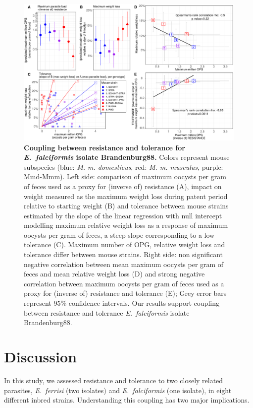 \begin{figure}[H]
    \centering
    \includegraphics[width=\linewidth,height=\textheight,keepaspectratio]{images/3article2/Fig5_final.pdf}
    \caption{\textbf{Coupling between resistance and tolerance for \textit{E.~falciformis} isolate Brandenburg88.} Colors represent mouse subspecies (blue: \textit{M. m. domesticus}, red: \textit{M. m. musculus}, purple: Mmd-Mmm). Left side: comparison of maximum oocysts per gram of feces used as a proxy for (inverse of) resistance (A), impact on weight measured as the maximum weight loss during patent period relative to starting weight (B) and tolerance between mouse strains estimated by the slope of the linear regression with null intercept modelling maximum relative weight loss as a response of maximum oocysts per gram of feces, a steep slope corresponding to a low tolerance (C). Maximum number of OPG, relative weight loss and tolerance differ between mouse strains. Right side: non significant negative correlation between mean maximum oocysts per gram of feces and mean relative weight loss (D) and strong negative correlation between maximum oocysts per gram of feces used as a proxy for (inverse of) resistance and tolerance (E); Grey error bars represent 95\% confidence intervals. Our results support coupling between resistance and tolerance \textit{E.~falciformis} isolate Brandenburg88.}
\end{figure}

\section{Discussion}

In this study, we assessed resistance and tolerance to two closely related parasites, \textit{E.~ferrisi} (two isolates) and \textit{E.~falciformis} (one isolate), in eight different inbred strains. Understanding this coupling has two major implications. \par

